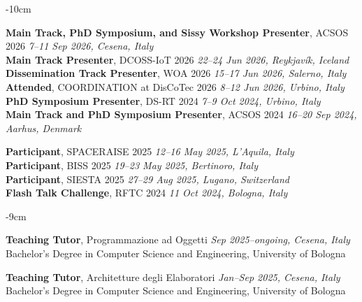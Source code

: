 \documentclass[10pt,a4paper]{altacv}
\begin{document}
\begin{adjustwidth}{}{-10cm}
    \divider


    \textcolor{accent}{\textbf{Main Track, PhD Symposium, and Sissy Workshop Presenter}}, ACSOS 2026
    \hfill \textit{7--11 Sep 2026, Cesena, Italy}\\
    \textcolor{accent}{\textbf{Main Track Presenter}}, DCOSS-IoT 2026
    \hfill \textit{22--24 Jun 2026, Reykjavík, Iceland}\\
    \textcolor{accent}{\textbf{Dissemination Track Presenter}}, WOA 2026
    \hfill \textit{15--17 Jun 2026, Salerno, Italy}\\
    \textcolor{accent}{\textbf{Attended}}, COORDINATION at DisCoTec 2026
    \hfill \textit{8--12 Jun 2026, Urbino, Italy}\\
    \textcolor{accent}{\textbf{PhD Symposium Presenter}}, DS-RT 2024
    \hfill \textit{7--9 Oct 2024, Urbino, Italy}\\
    \textcolor{accent}{\textbf{Main Track and PhD Symposium Presenter}}, ACSOS 2024
    \hfill \textit{16--20 Sep 2024, Aarhus, Denmark}

    \divider


    \textcolor{accent}{\textbf{Participant}}, SPACERAISE 2025
    \hfill \textit{12--16 May 2025, L'Aquila, Italy}\\
    \textcolor{accent}{\textbf{Participant}}, BISS 2025
    \hfill \textit{19--23 May 2025, Bertinoro, Italy}\\
    \textcolor{accent}{\textbf{Participant}}, SIESTA 2025
    \hfill \textit{27--29 Aug 2025, Lugano, Switzerland}\\
    \textcolor{accent}{\textbf{Flash Talk Challenge}}, RFTC 2024
    \hfill \textit{11 Oct 2024, Bologna, Italy}

    \normalsize
    \end{adjustwidth}

    \begin{adjustwidth}{}{-9cm}
        \small

        \textcolor{accent}{\textbf{Teaching Tutor}}, Programmazione ad Oggetti
        \hfill \textit{Sep 2025--ongoing, Cesena, Italy}\\
        Bachelor's Degree in Computer Science and Engineering,
        University of Bologna

        \divider

        \textcolor{accent}{\textbf{Teaching Tutor}}, Architetture degli Elaboratori
        \hfill \textit{Jan--Sep 2025, Cesena, Italy}\\
        Bachelor's Degree in Computer Science and Engineering,
        University of Bologna

        \normalsize
    \end{adjustwidth}
\end{document}
